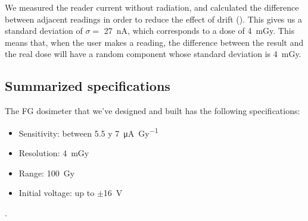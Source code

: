 We measured the reader current without radiation,
and calculated the difference between adjacent readings in order to reduce the effect of drift
().
This gives us a standard deviation of
$\sigma=$ \SI{27}{\nano\ampere},
which corresponds to a dose of \SI{4}{\milli\gray}.
This means that, when the user makes a reading,
the difference between the result and the real dose
will have a random component whose standard deviation is
\SI{4}{\milli\gray}.
\subsection{Summarized specifications}
The FG dosimeter that we've designed and built has the following specifications:
\begin{itemize}
    \item Sensitivity: between 5.5 y \SI{7}{\micro\ampere\per\gray}
    \item Resolution: \SI{4}{\milli\gray}
    \item Range: \SI{100}{\gray}
    \item Initial voltage: up to $\pm$\SI{16}{\volt}
\end{itemize}.
